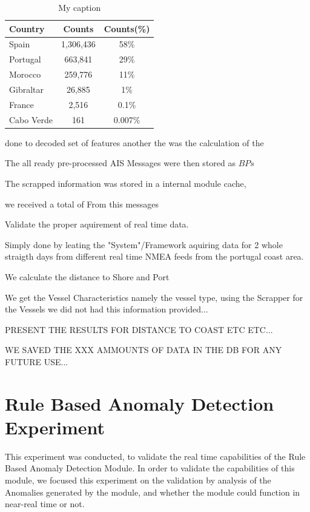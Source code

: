 \begin{table}[H]
\centering
\caption{My caption}
\label{my-label}
\begin{tabular}{@{}lcc@{}}
\toprule
Country & Counts & Counts(\%) \\ \midrule
Spain & 1,306,436 & 58\% \\
Portugal & 663,841 & 29\% \\
Morocco & 259,776 & 11\% \\
Gibraltar & 26,885 & 1\% \\
France & 2,516 & 0.1\% \\
Cabo Verde & 161 & 0.007\% \\ \bottomrule
\end{tabular}
\end{table}
done to decoded set of features another the was the calculation of the  

The all ready pre-processed AIS Messages were then stored as $BPs$

The scrapped information was stored in a internal module cache, 

we received a total of \textbf{}
From this messages 

Validate the proper aquirement of real time data.

Simply done by leating the "System"/Framework aquiring data for 2 whole straigth days from different real time NMEA feeds from the portugal coast area.

We calculate the distance to Shore and Port

We get the Vessel Characteristics namely the vessel type, using the Scrapper for the Vessels we did not had this information provided...

PRESENT THE RESULTS FOR DISTANCE TO COAST ETC ETC...

WE SAVED THE XXX AMMOUNTS OF DATA IN THE DB FOR ANY FUTURE USE...


\section{Rule Based Anomaly Detection Experiment}
\label{section: Rule Based Anomaly Detection Experiment}

This experiment was conducted, to validate the real time capabilities of the Rule Based Anomaly Detection Module. In order to validate the capabilities of this module, we focused this experiment on the validation by analysis of the Anomalies generated by the module, and whether the module could function in near-real time or not.

